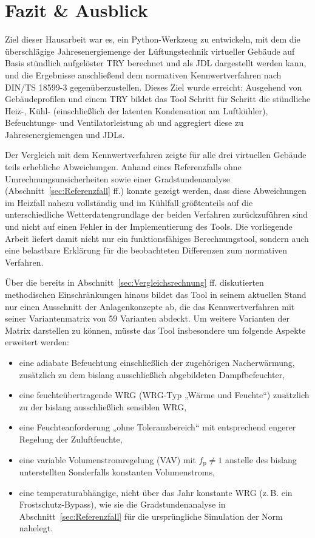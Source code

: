 \documentclass{scrreprt}
\begin{document}
\chapter{Fazit \& Ausblick}\label{chap:Fazit}

Ziel dieser Hausarbeit war es, ein Python-Werkzeug zu entwickeln, mit
dem die überschlägige Jahresenergiemenge der Lüftungstechnik
virtueller Gebäude auf Basis stündlich aufgelöster \ac{TRY} berechnet
und als \ac{JDL} dargestellt werden kann, und die Ergebnisse
anschließend dem normativen Kennwertverfahren nach DIN/TS 18599-3
gegenüberzustellen. Dieses Ziel wurde erreicht: Ausgehend von
Gebäudeprofilen und einem \ac{TRY} bildet das Tool Schritt für Schritt
die stündliche Heiz-, Kühl- (einschließlich der latenten Kondensation
am Luftkühler), Befeuchtungs- und Ventilatorleistung ab und aggregiert
diese zu Jahresenergiemengen und \acp{JDL}.

Der Vergleich mit dem Kennwertverfahren zeigte für alle drei
virtuellen Gebäude teils erhebliche Abweichungen. Anhand eines
Referenzfalls ohne Umrechnungsunsicherheiten sowie einer
Gradstundenanalyse (Abschnitt~\ref{sec:Referenzfall} ff.) konnte
gezeigt werden, dass diese Abweichungen im Heizfall nahezu
vollständig und im Kühlfall größtenteils auf die unterschiedliche
Wetterdatengrundlage der beiden Verfahren zurückzuführen sind und
nicht auf einen Fehler in der Implementierung des Tools. Die
vorliegende Arbeit liefert damit nicht nur ein funktionsfähiges
Berechnungstool, sondern auch eine belastbare Erklärung für die
beobachteten Differenzen zum normativen Verfahren.

Über die bereits in Abschnitt~\ref{sec:Vergleichsrechnung} ff.
diskutierten methodischen Einschränkungen hinaus bildet das Tool in
seinem aktuellen Stand nur einen Ausschnitt der Anlagenkonzepte ab,
die das Kennwertverfahren mit seiner Variantenmatrix von 59 Varianten
abdeckt. Um weitere Varianten der Matrix darstellen zu können, müsste
das Tool insbesondere um folgende Aspekte erweitert werden:

\begin{itemize}
    \item eine adiabate Befeuchtung einschließlich der zugehörigen
    Nacherwärmung, zusätzlich zu dem bislang ausschließlich
    abgebildeten Dampfbefeuchter,
    \item eine feuchteübertragende \ac{WRG} (WRG-Typ „Wärme und
    Feuchte“) zusätzlich zu der bislang ausschließlich sensiblen
    \ac{WRG},
    \item eine Feuchteanforderung „ohne Toleranzbereich“ mit
    entsprechend engerer Regelung der Zuluftfeuchte,
    \item eine variable Volumenstromregelung (\ac{VAV}) mit
    $f_{\mathrm{p}} \neq 1$ anstelle des bislang unterstellten
    Sonderfalls konstanten Volumenstroms,
    \item eine temperaturabhängige, nicht über das Jahr konstante
    \ac{WRG} (z.\,B. ein Frostschutz-Bypass), wie sie die
    Gradstundenanalyse in Abschnitt~\ref{sec:Referenzfall} für die
    ursprüngliche Simulation der Norm nahelegt.
\end{itemize}
\end{document}
